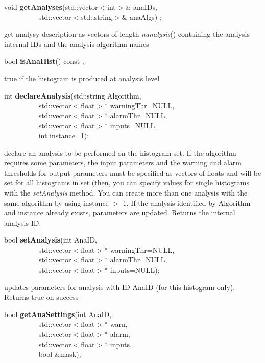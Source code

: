 \item    void {\bf getAnalyses}(std::vector$<$int$>$\& anaIDs,\\\mbox{}~~~~~~~~~
		   std::vector$<$std::string$>$\& anaAlgs) ;

 get analysy description as vectors of length {\it  nanalysis}() containing 
 the analysis internal IDs and the analysis algorithm names


\item    bool {\bf isAnaHist}() const ;

 true if the histogram is produced at analysis level


\item    int {\bf declareAnalysis}(std::string Algorithm,\\\mbox{}~~~~~~~~~ 
                      std::vector$<$float$>$* warningThr=NULL,\\\mbox{}~~~~~~~~~ 
                      std::vector$<$float$>$* alarmThr=NULL,\\\mbox{}~~~~~~~~~ 
                      std::vector$<$float$>$* inputs=NULL,\\\mbox{}~~~~~~~~~ 
                      int instance=1);

 declare an analysis to be performed on the histogram set. If the algorithm
 requires some parameters, the input parameters and the warning and alarm 
 thresholds for output parameters must be
 specified as vectors of floats and will be set for all histograms in
 set (then, you can specify values for single histograms with the {\it
 setAnalysis} method. 
 You can create more than one analysis
 with the same algorithm by using instance $>$ 1. If the analysis
 identified by Algorithm and instance already exists, parameters are
 updated. Returns the internal analysis ID.


\item    bool {\bf setAnalysis}(int AnaID,\\\mbox{}~~~~~~~~~ 
                   std::vector$<$float$>$* warningThr=NULL,\\\mbox{}~~~~~~~~~ 
                   std::vector$<$float$>$* alarmThr=NULL,\\\mbox{}~~~~~~~~~ 
                   std::vector$<$float$>$* inputs=NULL);

 updates parameters for analysis with ID AnaID (for this histogram only). Returns true on success


\item    bool {\bf getAnaSettings}(int AnaID,\\\mbox{}~~~~~~~~~
                      std::vector$<$float$>$* warn,\\\mbox{}~~~~~~~~~ 
                      std::vector$<$float$>$* alarm,\\\mbox{}~~~~~~~~~
                      std::vector$<$float$>$* inputs,\\\mbox{}~~~~~~~~~
                      bool \&mask);

